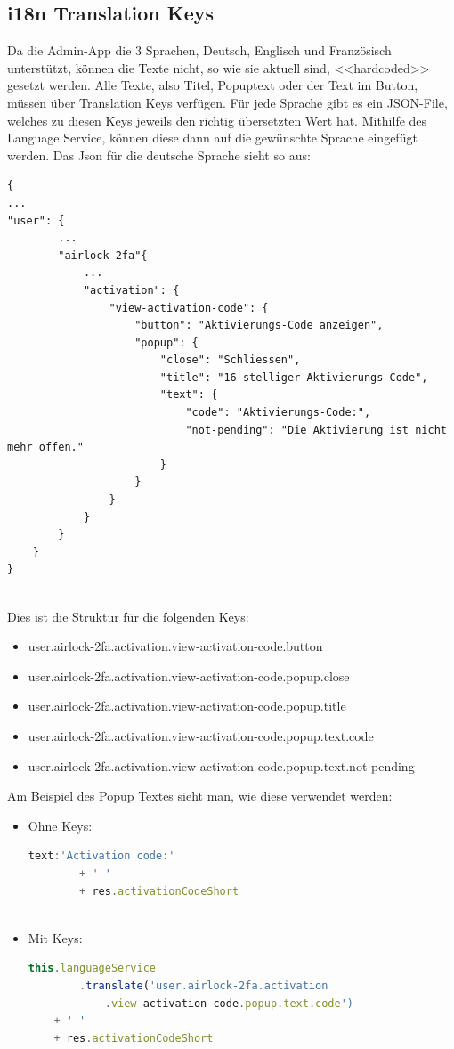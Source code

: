 \subsection{i18n Translation Keys}
Da die Admin-App die 3 Sprachen, Deutsch, Englisch und Französisch unterstützt, können die Texte nicht, so wie sie aktuell sind, <<hardcoded>> gesetzt werden. Alle Texte, also Titel, Popuptext oder der Text im Button, müssen über Translation Keys verfügen. Für jede Sprache gibt es ein JSON-File, welches zu diesen Keys jeweils den richtig übersetzten Wert hat. Mithilfe des Language Service, können diese dann auf die gewünschte Sprache eingefügt werden. Das Json für die deutsche Sprache sieht so aus:
\begin{verbatim}
{
...
"user": {
		...
		"airlock-2fa"{
			...
			"activation": {
				"view-activation-code": {
					"button": "Aktivierungs-Code anzeigen",
					"popup": {
						"close": "Schliessen",
						"title": "16-stelliger Aktivierungs-Code",
						"text": {
							"code": "Aktivierungs-Code:",
							"not-pending": "Die Aktivierung ist nicht mehr offen."
						}
					}
				}
			}
		}
	}
}
	

\end{verbatim}
Dies ist die Struktur für die folgenden Keys:
\begin{itemize}
	\item user.airlock-2fa.activation.view-activation-code.button
	\item user.airlock-2fa.activation.view-activation-code.popup.close
	\item user.airlock-2fa.activation.view-activation-code.popup.title
	\item user.airlock-2fa.activation.view-activation-code.popup.text.code
	\item user.airlock-2fa.activation.view-activation-code.popup.text.not-pending
\end{itemize}
Am Beispiel des Popup Textes sieht man, wie diese verwendet werden:
\begin{itemize}
	\item Ohne Keys:
	\begin{lstlisting}[language=TypeScript]
	text:'Activation code:'
		+ ' '
		+ res.activationCodeShort
		
	\end{lstlisting}
	\item Mit Keys:
	\begin{lstlisting}[language=TypeScript]
   	this.languageService
        .translate('user.airlock-2fa.activation
        	.view-activation-code.popup.text.code')
	+ ' '
	+ res.activationCodeShort
	\end{lstlisting}	
\end{itemize}
